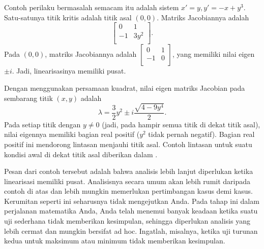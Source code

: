 \begin{example}
Contoh perilaku bermasalah semacam itu adalah sistem
$x'=y, y' = -x+y^3$. Satu-satunya titik kritis
adalah titik asal $(0,0)$. Matriks Jacobiannya adalah
\begin{equation*}
\begin{bmatrix}
0 & 1 \\
-1 & 3 y^2 \\
\end{bmatrix} .
\end{equation*}
Pada
$(0,0)$, matriks Jacobiannya adalah
$\left[ \begin{smallmatrix}
0 & 1 \\
-1 & 0 \\
\end{smallmatrix} \right]$, yang memiliki nilai eigen $\pm i$. Jadi,
linearisasinya memiliki pusat.

Dengan menggunakan persamaan kuadrat, nilai eigen
matriks Jacobian pada sembarang titik $(x,y)$ adalah
\begin{equation*}
\lambda = 
\frac{3}{2}y^2 \pm
i
\frac{\sqrt{4-9y^4}}{2} .
\end{equation*}
Pada setiap titik dengan $y \neq 0$ (jadi, pada hampir semua titik di dekat titik asal), nilai eigennya memiliki bagian real positif ($y^2$ tidak pernah
negatif). Bagian real positif ini
mendorong lintasan menjauhi titik asal. Contoh lintasan untuk suatu
kondisi awal di dekat titik asal diberikan dalam
.
\begin{myfig}
\capstart
{}
\caption{Titik kritis tak stabil (sumber spiral) pada titik asal
untuk $x'=y, y' = -x+y^3$, meskipun linearisasinya memiliki pusat. \label{fig:nlin-unstable-center}}
\end{myfig}
\end{example}

Pesan dari contoh tersebut adalah bahwa analisis lebih lanjut diperlukan ketika
linearisasi memiliki pusat. Analisisnya secara umum akan lebih
rumit daripada contoh di atas dan lebih mungkin memerlukan
pertimbangan kasus demi kasus. Kerumitan seperti ini seharusnya tidak
mengejutkan Anda. Pada tahap ini dalam perjalanan matematika Anda, Anda telah
menemui banyak keadaan ketika suatu uji sederhana tidak memberikan kesimpulan,
sehingga diperlukan analisis yang lebih cermat dan mungkin bersifat ad hoc.
Ingatlah, misalnya, ketika
uji turunan kedua untuk maksimum atau minimum
tidak memberikan kesimpulan.

